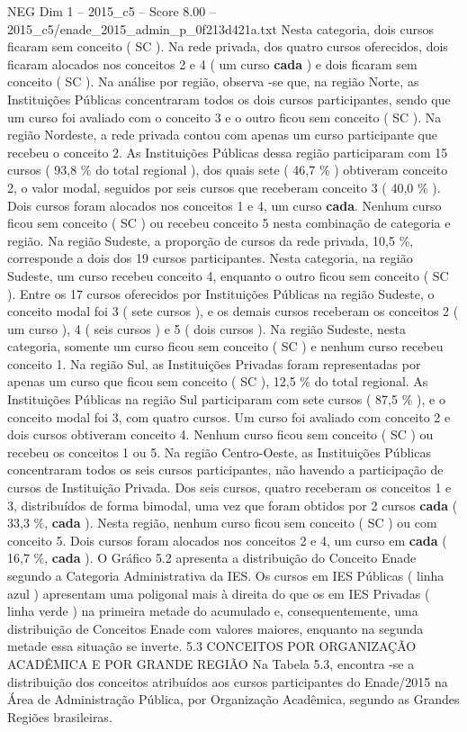 \begin{textsample}{NEG Dim 1 – 2015\_c5 – Score 8.00 – 2015\_c5/enade\_2015\_admin\_p\_0f213d421a.txt}
Nesta categoria, dois cursos ficaram sem conceito ( SC ).
Na rede privada, dos quatro cursos oferecidos, dois ficaram alocados nos conceitos 2 e 4 ( um curso \textbf{cada} ) e dois ficaram sem conceito ( SC ).
Na análise por região, observa -se que, na região Norte, as Instituições Públicas concentraram todos os dois cursos participantes, sendo que um curso foi avaliado com o conceito 3 e o outro ficou sem conceito ( SC ).
Na região Nordeste, a rede privada contou com apenas um curso participante que recebeu o conceito 2.
As Instituições Públicas dessa região participaram com 15 cursos ( 93,8 \% do total regional ), dos quais sete ( 46,7 \% ) obtiveram conceito 2, o valor modal, seguidos por seis cursos que receberam conceito 3 ( 40,0 \% ).
Dois cursos foram alocados nos conceitos 1 e 4, um curso \textbf{cada}.
Nenhum curso ficou sem conceito ( SC ) ou recebeu conceito 5 nesta combinação de categoria e região.
Na região Sudeste, a proporção de cursos da rede privada, 10,5 \%, corresponde a dois dos 19 cursos participantes.
Nesta categoria, na região Sudeste, um curso recebeu conceito 4, enquanto o outro ficou sem conceito ( SC ).
Entre os 17 cursos oferecidos por Instituições Públicas na região Sudeste, o conceito modal foi 3 ( sete cursos ), e os demais cursos receberam os conceitos 2 ( um curso ), 4 ( seis cursos ) e 5 ( dois cursos ).
Na região Sudeste, nesta categoria, somente um curso ficou sem conceito ( SC ) e nenhum curso recebeu conceito 1.
Na região Sul, as Instituições Privadas foram representadas por apenas um curso que ficou sem conceito ( SC ), 12,5 \% do total regional.
As Instituições Públicas na região Sul participaram com sete cursos ( 87,5 \% ), e o conceito modal foi 3, com quatro cursos.
Um curso foi avaliado com conceito 2 e dois cursos obtiveram conceito 4.
Nenhum curso ficou sem conceito ( SC ) ou recebeu os conceitos 1 ou 5.
Na região Centro-Oeste, as Instituições Públicas concentraram todos os seis cursos participantes, não havendo a participação de cursos de Instituição Privada.
Dos seis cursos, quatro receberam os conceitos 1 e 3, distribuídos de forma bimodal, uma vez que foram obtidos por 2 cursos \textbf{cada} ( 33,3 \%, \textbf{cada} ).
Nesta região, nenhum curso ficou sem conceito ( SC ) ou com conceito 5.
Dois cursos foram alocados nos conceitos 2 e 4, um curso em \textbf{cada} ( 16,7 \%, \textbf{cada} ).
O Gráfico 5.2 apresenta a distribuição do Conceito Enade segundo a Categoria Administrativa da IES.
Os cursos em IES Públicas ( linha azul ) apresentam uma poligonal mais à direita do que os em IES Privadas ( linha verde ) na primeira metade do acumulado e, consequentemente, uma distribuição de Conceitos Enade com valores maiores, enquanto na segunda metade essa situação se inverte. 5.3 CONCEITOS POR ORGANIZAÇÃO ACADÊMICA E POR GRANDE REGIÃO Na Tabela 5.3, encontra -se a distribuição dos conceitos atribuídos aos cursos participantes do Enade/2015 na Área de Administração Pública, por Organização Acadêmica, segundo as Grandes Regiões brasileiras.

\end{textsample}
